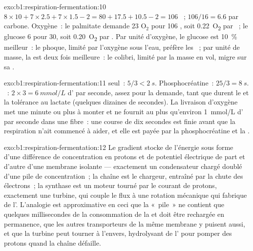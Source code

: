 \begin{solution}{exo:b1:respiration-fermentation:10}
$8\times 10 + 7\times 2.5 + 7\times 1.5 - 2 = 80 + 17.5 + 10.5 - 2 =
106$ ~; $106/16 = 6.6$ par carbone. Oxygène~: le palmitate demande 23
$\mathrm{O_2}$ pour 106 , soit \qty{0.22}{O_2} par ~; le glucose 6
pour 30, soit \qty{0.20}{O_2} par . Par unité d'oxygène, le glucose
est \qty{10}{\%} meilleur~: le phoque, limité par l'oxygène sous l'eau,
préfère les ~; par unité de masse, la  est deux fois
meilleure~: le colibri, limité par la masse en vol, migre sur sa
.
\end{solution}

\begin{solution}{exo:b1:respiration-fermentation:11}
 seul~: $5/3 < \qty{2}{s}$. Phosphocréatine~: $25/3 = \qty{8}{s}$.
~: $2\times 3 = \qty{6}{mmol/L}$ d' par seconde, assez
pour la demande, tant que durent le  et la tolérance au
lactate (quelques dizaines de secondes). La livraison d'oxygène met une
minute ou plus à monter et ne fournit au plus qu'environ
\qty{1}{mmol/L} d' par seconde dans une fibre~: une course de dix
secondes est finie avant que la respiration n'ait commencé à aider, et
elle est payée par la phosphocréatine et la .
\end{solution}

\begin{solution}{exo:b1:respiration-fermentation:12}
Le gradient stocke de l'énergie sous forme d'une différence de
concentration en protons et de potentiel électrique de part et d'autre
d'une membrane isolante --- exactement un condensateur chargé doublé
d'une pile de concentration~; la chaîne est le chargeur, entraîné par la
chute des électrons~; la synthase est un moteur tourné par le courant de
protons, exactement une turbine, qui couple le flux à une rotation
mécanique qui fabrique de l'. L'analogie est approximative en ceci
que la «~pile~» ne contient que quelques millisecondes de la
consommation de la  et doit être rechargée en permanence, que les
autres transporteurs de la même membrane y puisent aussi, et que la
turbine peut tourner à l'envers, hydrolysant de l' pour pomper des
protons quand la chaîne défaille.
\end{solution}


